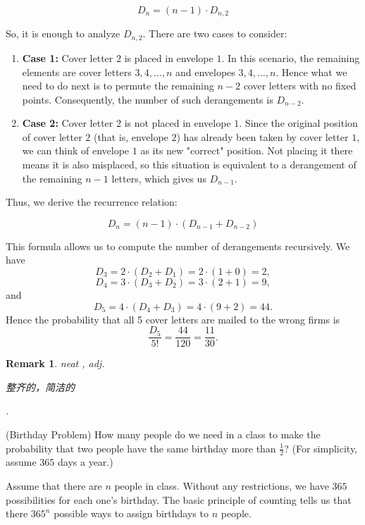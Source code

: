 \documentclass[12pt,letterpaper, onecolumn]{exam}
\newtheorem{remark}{Remark}
\begin{document}
\begin{questions}
\begin{solution}
\[
D_n = (n-1) \cdot D_{n,2}
\]

\quad So, it is enough to analyze \( D_{n,2} \). There are two cases to consider:

\begin{enumerate}
    \item \textbf{Case 1:} Cover letter \( 2 \) is placed in envelope \( 1 \). In this scenario, the remaining elements are cover letters \( 3,4,\dots,n \) and envelopes \( 3,4,\dots,n \). Hence what we need to do next is to permute the remaining $n-2$ cover letters with no fixed points. Consequently, the number of such derangements is $D_{n-2}$.
    \item \textbf{Case 2:} Cover letter \( 2 \) is not placed in envelope \( 1 \). Since the original position of cover letter \( 2 \) (that is, envelope \( 2 \)) has already been taken by cover letter \( 1 \), we can think of envelope \( 1 \) as its new "correct" position. Not placing it there means it is also misplaced, so this situation is equivalent to a derangement of the remaining \( n-1 \) letters, which gives us \( D_{n-1} \).
\end{enumerate}

\quad Thus, we derive the recurrence relation:

\[
D_n = (n-1) \cdot (D_{n-1} + D_{n-2})
\]

This formula allows us to compute the number of derangements recursively. We have 
$$D_3=2\cdot(D_2+D_1)=2\cdot(1+0)=2,$$
$$D_4=3\cdot(D_3+D_2)=3\cdot(2+1)=9,$$
and
$$D_5=4\cdot(D_4+D_3)=4\cdot(9+2)=44.$$
Hence the probability that all 5 cover letters are mailed to the wrong firms is
$$\frac{D_5}{5!}=\frac{44}{120}=\frac{11}{30}.$$
    \end{solution}
    \begin{remark}
        neat , adj. \begin{CJK}{UTF8}{gbsn}整齐的，简洁的\end{CJK}.
    \end{remark}
    
    \question[2 Marks] (Birthday Problem) How many people do we need in a class to make the probability that two people have the same birthday more than $\frac{1}{2}$? (For simplicity, assume $365$ days a year.)
    \begin{solution}
        Assume that there are $n$ people in class. Without any restrictions, we have $365$ possibilities for each one's birthday. The basic principle of counting tells us that there $365^n$ possible ways to assign birthdays to $n$ people.
        

\end{solution}
\end{questions}
\end{document}
